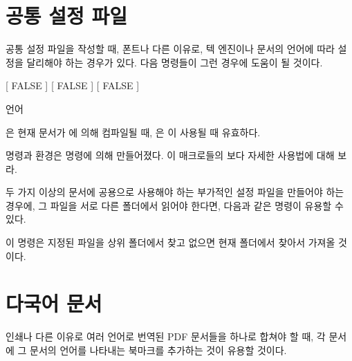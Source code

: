 \documentclass[pairquote, minted]{hzguide}
\begin{document}
\section{공통 설정 파일}

공통 설정 파일을 작성할 때, 폰트나 다른 이유로, 텍 엔진이나 문서의 언어에 따라 설정을 달리해야 하는 경우가 있다. 
다음 명령들이 그런 경우에 도움이 될 것이다.

\begin{code}
[ FALSE ]
[ FALSE ]
[ FALSE ]
\begin{IfLanguage}{언어} \end{IfLanguage}
\end{code}

\macro{\IfXetex}은 현재 문서가 에 의해 컴파일될 때, \macro{\IfLuatex}은 이 사용될 때 유효하다.


\macro{\ifLang} 명령과  환경은 \macro{\NewConditionals} 명령에 의해 만들어졌다.
이 매크로들의 보다 자세한 사용법에 대해 \를 보라.

두 가지 이상의 문서에 공용으로 사용해야 하는 부가적인 설정 파일을 만들어야 하는 경우에, 그 파일을 서로 다른 폴더에서 읽어야 한다면, 다음과 같은 명령이 유용할 수 있다.

\begin{code}
\NewDocumentCommand {}
{
    { 
         
    }{
    }
}
\end{code}

이 명령은 지정된 파일을 상위 폴더에서 찾고 없으면 현재 폴더에서 찾아서 가져올 것이다.

\section{다국어 문서}

인쇄나 다른 이유로 여러 언어로 번역된 PDF 문서들을 하나로 합쳐야 할 때, 각 문서에 그 문서의 언어를 나타내는 북마크를 추가하는 것이 유용할 것이다.

\begin{code}
\NewDocumentCommand {}
{
}
\end{code}
\end{document}
